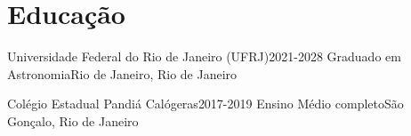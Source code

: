 \section{Educação}
    \resumeSubHeadingListStart

    \resumeSubheading
    {Universidade Federal do Rio de Janeiro (UFRJ)}{2021-2028}
    {Graduado em Astronomia}{Rio de Janeiro, Rio de Janeiro}
    
    \resumeSubheading
    {Colégio Estadual Pandiá Calógeras}{2017-2019}
    {Ensino Médio completo}{São Gonçalo, Rio de Janeiro}

    
    \resumeSubHeadingListEnd